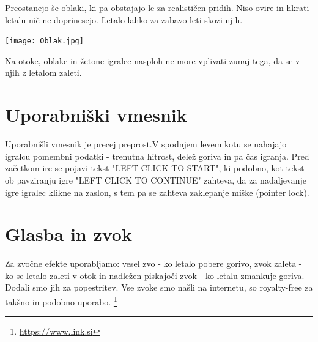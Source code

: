 \documentclass[a4paper]{article}
\begin{document}
Preostanejo še oblaki, ki pa obstajajo le za realističen pridih. Niso ovire in hkrati letalu nič ne doprinesejo. Letalo lahko za zabavo leti skozi njih.
\begin{center}
     \texttt{[image: Oblak.jpg]}
\end{center}

Na otoke, oblake in žetone igralec nasploh ne more vplivati zunaj tega, da se v njih z letalom zaleti. 

\section{Uporabniški vmesnik}%
Uporabnišli vmesnik je precej preprost.V spodnjem levem kotu se nahajajo igralcu pomembni podatki - trenutna hitrost, delež goriva in pa čas igranja. Pred začetkom ire se pojavi tekst "LEFT CLICK TO START", ki podobno, kot tekst ob pavziranju igre "LEFT CLICK TO CONTINUE" zahteva, da za nadaljevanje igre igralec klikne na zaslon, s tem pa se zahteva zaklepanje miške (pointer lock).  

\section{Glasba in zvok}%
Za zvočne efekte uporabljamo: vesel zvo - ko letalo pobere gorivo, zvok zaleta - ko se letalo zaleti v otok in nadležen piskajoči zvok - ko letalu zmankuje goriva. Dodali smo jih za popestritev. Vse zvoke smo našli na internetu, so royalty-free za takšno in podobno uporabo. \footnote{\url{https://www.link.si}}
\end{document}
